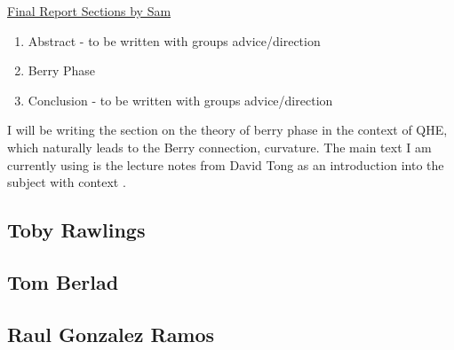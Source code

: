 \documentclass[notitlepage, a4paper, prl, aps]{revtex4}
\begin{document}
\underline{Final Report Sections by Sam}

\begin{enumerate}
    \item Abstract - to be written with groups advice/direction
    \item Berry Phase
    \item Conclusion - to be written with groups advice/direction
\end{enumerate}

I will be writing the section on the theory of berry phase in the context of QHE, which naturally leads to the Berry connection, curvature.
The main text I am currently using is the lecture notes from David Tong as an introduction into the subject with context \cite{Tong}.

\subsection*{Toby Rawlings}

\subsection*{Tom Berlad}

\subsection*{Raul Gonzalez Ramos}



\end{document}
